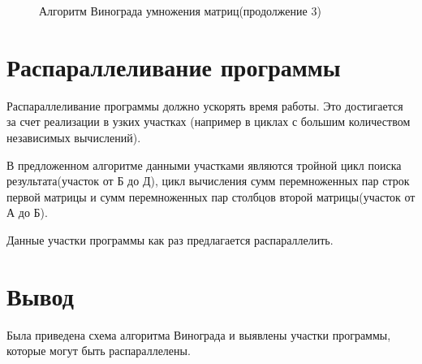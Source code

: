 \documentclass[a4paper,12pt]{report}
\begin{document}
\begin{figure}[ht!]
\caption{Алгоритм Винограда умножения матриц(продолжение 3)}
\end{figure}

\section{Распараллеливание программы}
Распараллеливание программы должно ускорять время работы. Это достигается за счет реализации в узких участках (например в циклах с большим количеством независимых вычислений).

В предложенном алгоритме данными участками  являются тройной цикл поиска результата(участок от Б до Д), цикл вычисления сумм перемноженных пар строк первой матрицы и  сумм перемноженных пар столбцов второй матрицы(участок от А до Б).

Данные участки программы как раз предлагается распараллелить.

\section{Вывод}
Была приведена схема алгоритма Винограда и выявлены участки программы, которые могут быть распараллелены. 
\end{document}
